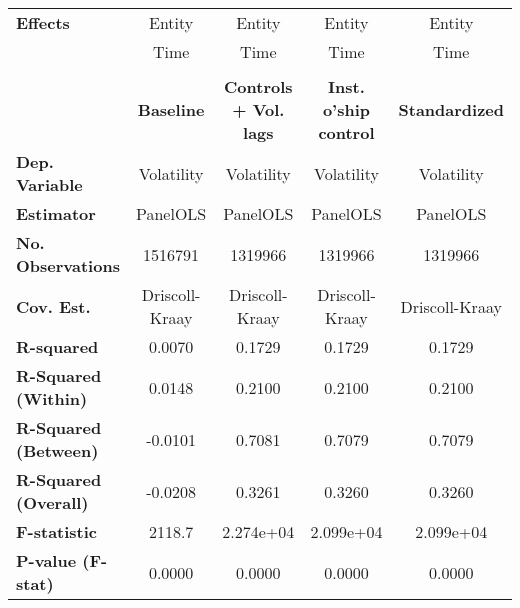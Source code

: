 {\begin{longtable}{lcccc}
\midrule
\textbf{Effects}                           &       Entity       &             Entity            &             Entity            &         Entity         \\
& Time & Time & Time & Time\\
\bottomrule
\bigskip\\
\toprule
& \textbf{Baseline}  & \textbf{Controls + Vol. lags} & \textbf{Inst. o'ship control} & \textbf{Standardized}  \\
\midrule
\textbf{Dep. Variable}                     &     Volatility     &           Volatility          &           Volatility          &       Volatility       \\
\textbf{Estimator}                         &      PanelOLS      &            PanelOLS           &            PanelOLS           &        PanelOLS        \\
\textbf{No. Observations}                  &      1516791       &            1319966            &            1319966            &        1319966         \\
\textbf{Cov. Est.}                         &   Driscoll-Kraay   &         Driscoll-Kraay        &         Driscoll-Kraay        &     Driscoll-Kraay     \\
\textbf{R-squared}                         &       0.0070       &             0.1729            &             0.1729            &         0.1729         \\
\textbf{R-Squared (Within)}                &       0.0148       &             0.2100            &             0.2100            &         0.2100         \\
\textbf{R-Squared (Between)}               &      -0.0101       &             0.7081            &             0.7079            &         0.7079         \\
\textbf{R-Squared (Overall)}               &      -0.0208       &             0.3261            &             0.3260            &         0.3260         \\
\textbf{F-statistic}                       &       2118.7       &           2.274e+04           &           2.099e+04           &       2.099e+04        \\
\textbf{P-value (F-stat)}                  &       0.0000       &             0.0000            &             0.0000            &         0.0000         \\
\bottomrule
\end{longtable}
}
